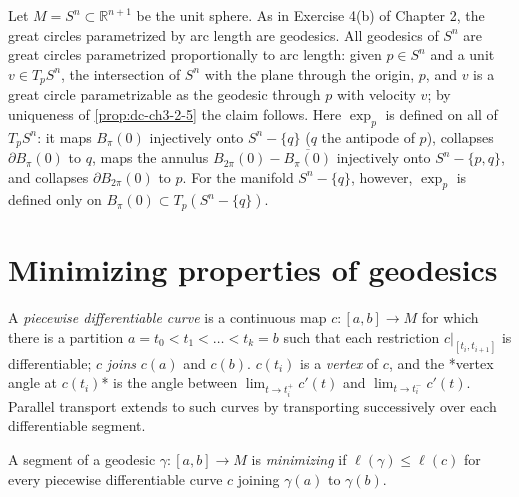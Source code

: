 \begin{example}
  \label{ex:dc-ch3-2-11}
  Let $M=S^n\subset\mathbb{R}^{n+1}$ be the unit sphere. As in Exercise 4(b) of
  Chapter 2, the great circles parametrized by arc length are geodesics. All
  geodesics of $S^n$ are great circles parametrized proportionally to arc length:
  given $p\in S^n$ and a unit $v\in T_pS^n$, the intersection of $S^n$ with the
  plane through the origin, $p$, and $v$ is a great circle parametrizable as the
  geodesic through $p$ with velocity $v$; by uniqueness of \cref{prop:dc-ch3-2-5} the claim
  follows. Here $\exp_p$ is defined on all of $T_p S^n$: it maps $B_\pi(0)$
  injectively onto $S^n-\{q\}$ ($q$ the antipode of $p$), collapses
  $\partial B_\pi(0)$ to $q$, maps the annulus $B_{2\pi}(0)-\overline{B_\pi(0)}$
  injectively onto $S^n-\{p,q\}$, and collapses $\partial B_{2\pi}(0)$ to $p$.
  For the manifold $S^n-\{q\}$, however, $\exp_p$ is defined only on
  $B_\pi(0)\subset T_p(S^n-\{q\})$.
\end{example}

\section{Minimizing properties of geodesics}

\begin{definition}
  \label{def:dc-ch3-3-1}
  A \emph{piecewise differentiable curve} is a continuous map $c:[a,b]\to M$ for which
  there is a partition $a=t_0<t_1<\dots<t_k=b$ such that each restriction
  $c|_{[t_i,t_{i+1}]}$ is differentiable; $c$ \emph{joins} $c(a)$ and $c(b)$. $c(t_i)$ is
  a \emph{vertex} of $c$, and the *vertex angle at $c(t_i)$* is the angle between
  $\lim_{t\to t_i^+}c'(t)$ and $\lim_{t\to t_i^-}c'(t)$. Parallel transport extends
  to such curves by transporting successively over each differentiable segment.
\end{definition}

\begin{definition}
  \label{def:dc-ch3-3-2}
  A segment of a geodesic $\gamma:[a,b]\to M$ is \emph{minimizing} if
  $\ell(\gamma)\le\ell(c)$ for every piecewise differentiable curve $c$ joining
  $\gamma(a)$ to $\gamma(b)$.
\end{definition}

